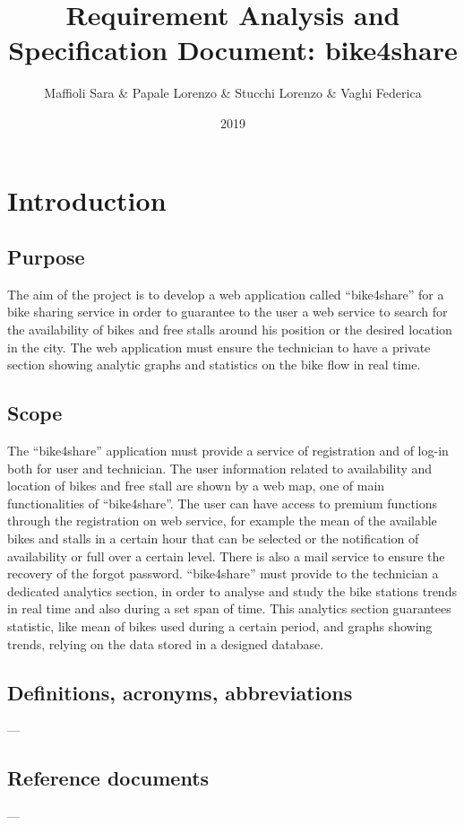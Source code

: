 \documentclass{article}
\title{Requirement Analysis and Specification Document: bike4share}
\author{Maffioli Sara \& Papale Lorenzo \& Stucchi Lorenzo \& Vaghi Federica}
\date{2019}
\begin{document}
\maketitle
\tableofcontents

\newpage

\section{Introduction}
\subsection{Purpose}
The aim of the project is to develop a web application called “bike4share” for a bike sharing service in order to guarantee to the user a web service to search for the availability of bikes and free stalls around his position or the desired location in the city. The web application must ensure the technician to have a private section showing analytic graphs and statistics on the bike flow in real time.
\subsection{Scope}
The “bike4share” application must provide a service of registration and of log-in both for user and technician. The user information related to availability and location of bikes and free stall are shown by a web map, one of main functionalities of “bike4share”. The user can have access to premium functions through the registration on web service, for example the mean of the available bikes and stalls in a certain hour that can be selected or the notification of availability or full over a certain level. There is also a mail service to ensure the recovery of the forgot password.
“bike4share” must provide to the technician a dedicated analytics section, in order to analyse and study the bike stations trends in real time and also during a set span of time. This analytics section guarantees statistic, like mean of bikes used during a certain period, and graphs showing trends, relying on the data stored in a designed database.
\subsection{Definitions, acronyms, abbreviations}
---
\subsection{Reference documents}
---
\end{document}
